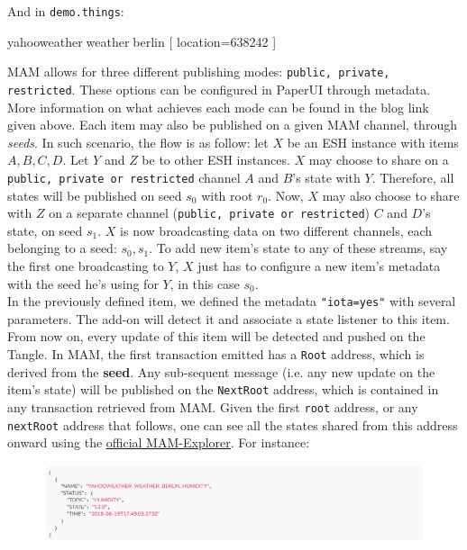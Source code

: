 \documentclass[a4paper,10pt]{article}
\begin{document}
\noindent And in \texttt{demo.things}:

\begin{center}
\begin{tcolorbox}
\textcolor{TypeItem}{yahooweather}\textcolor{white}{:}\textcolor{TypeItem}{weather}\textcolor{white}{:}\textcolor{NameItem}{berlin} \textcolor{GroupItem}{[ location=638242 ]}
\end{tcolorbox}
\end{center}

\noindent MAM allows for three different publishing modes: \texttt{public, private, restricted}. These options can be configured in PaperUI through metadata. More information on what achieves each mode can be found in the blog link given above. Each item may also be published on a given MAM channel, through \textit{seeds}. In such scenario, the flow is as follow: let $X$ be an ESH instance with items $A, B, C, D$. Let $Y$ and $Z$ be to other ESH instances. $X$ may choose to share on a \texttt{public, private or restricted} channel $A$ and $B$'s state with $Y$. Therefore, all states will be published on seed $s_0$ with root $r_0$. Now, $X$ may also choose to share with $Z$ on a separate channel (\texttt{public, private or restricted}) $C$ and $D$'s state, on seed $s_1$. $X$ is now broadcasting data on two different channels, each belonging to a seed: $s_0, s_1$. To add new item's state to any of these streams, say the first one broadcasting to $Y$, $X$ just has to configure a new item's metadata with the seed he's using for $Y$, in this case $s_0$. \\ 

\noindent In the previously defined item, we defined the metadata \texttt{"iota=yes"} with several parameters. The add-on will detect it and associate a state listener to this item. From now on, every update of this item will be detected and pushed on the Tangle. In MAM, the first transaction emitted has a \texttt{Root} address, which is derived from the \textbf{seed}. Any sub-sequent message (i.e. any new update on the item's state) will be published on the \texttt{NextRoot} address, which is contained in any transaction retrieved from MAM. Given the first \texttt{root} address, or any \texttt{nextRoot} address that follows, one can see all the states shared from this address onward using the \textcolor{blue}{\underline{\href{https://mam-explorer.firebaseapp.com/}{official MAM-Explorer}}}. For instance:

\begin{figure}[H]
  \center
  \includegraphics[scale=0.50]{images/mam_retrieve.png}
\end{figure}
\end{document}
